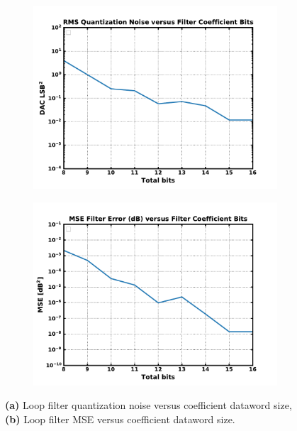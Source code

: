 	\begin{figure}[htb!]
	    \centering
	    \begin{subfigure}{0.5\textwidth}
	        \centering
	        \includegraphics[width=1\textwidth, angle=0]{./figs/design/lf_quant_noise}
	        \caption{ }
	        \label{fig:lf_quant_noise}
	    \end{subfigure}%
	    \begin{subfigure}{0.5\textwidth}
	        \centering
	        \includegraphics[width=1\textwidth, angle=0]{./figs/design/lf_mse}
	        \caption{ }
	        \label{fig:lf_mse}
	    \end{subfigure}
	    \caption{\textbf{(a)} Loop filter quantization noise versus coefficient dataword size, \textbf{(b)} Loop filter MSE versus coefficient dataword size.}
	    \label{fig:lf_bits_opt}
	\end{figure} 


